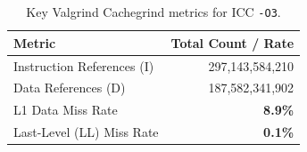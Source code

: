 \begin{table}[H]
\centering
\caption{Key Valgrind Cachegrind metrics for ICC \texttt{-O3}.}
\label{tab:cachegrind_results_o3}
\begin{tabular}{lr}
\toprule
\textbf{Metric} & \textbf{Total Count / Rate} \\
\midrule
Instruction References (I) & 297,143,584,210 \\
Data References (D)        & 187,582,341,902 \\
\midrule
L1 Data Miss Rate          & \textbf{8.9\%} \\
Last-Level (LL) Miss Rate  & \textbf{0.1\%} \\
\bottomrule
\end{tabular}
\end{table}